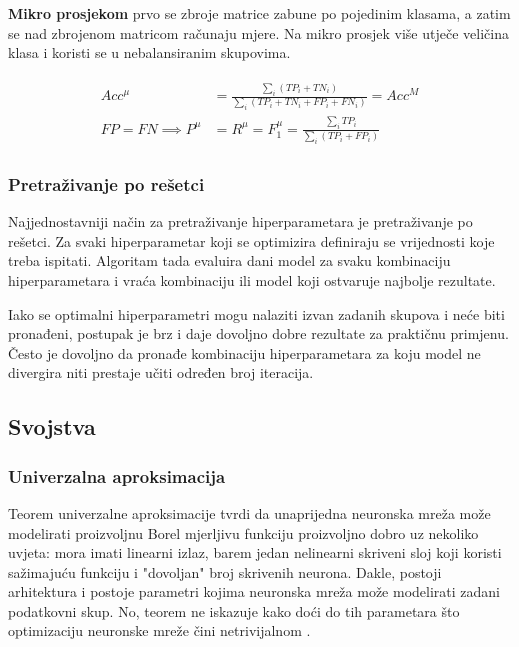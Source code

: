 \documentclass[times, utf8, numeric, diplomski]{fer}
\begin{document}
\textbf{Mikro prosjekom} prvo se zbroje matrice zabune po pojedinim klasama, a zatim se nad zbrojenom matricom računaju mjere. Na mikro prosjek više utječe veličina klasa i koristi se u nebalansiranim skupovima.

\begin{align}
\begin{split}
Acc^\mu &= \frac{\sum_i (TP_i+TN_i)}{\sum_i (TP_i+TN_i+FP_i+FN_i)} = Acc^M \\
FP = FN \implies P^\mu &= R^\mu = F_1^\mu = \frac{\sum_i TP_i}{\sum_i (TP_i+FP_i)}
\end{split}
\end{align}

\subsubsection{Pretraživanje po rešetci}
\label{sec:grid_search}
Najjednostavniji način za pretraživanje hiperparametara je pretraživanje po rešetci. Za svaki hiperparametar koji se optimizira definiraju se vrijednosti koje treba ispitati. Algoritam tada evaluira dani model za svaku kombinaciju hiperparametara i vraća kombinaciju ili model koji ostvaruje najbolje rezultate.

Iako se optimalni hiperparametri mogu nalaziti izvan zadanih skupova i neće biti pronađeni, postupak je brz i daje dovoljno dobre rezultate za praktičnu primjenu. Često je dovoljno da pronađe kombinaciju hiperparametara za koju model ne divergira niti prestaje učiti određen broj iteracija.

\subsection{Svojstva}
\label{sec:svojstva}

\subsubsection{Univerzalna aproksimacija}
Teorem univerzalne aproksimacije tvrdi da unaprijedna neuronska mreža može modelirati proizvoljnu Borel mjerljivu funkciju proizvoljno dobro uz nekoliko uvjeta: mora imati linearni izlaz, barem jedan nelinearni skriveni sloj koji koristi sažimajuću funkciju i "dovoljan" broj skrivenih neurona. Dakle, postoji arhitektura i postoje parametri kojima neuronska mreža može modelirati zadani podatkovni skup. No, teorem ne iskazuje kako doći do tih parametara što optimizaciju neuronske mreže čini netrivijalnom \citep[poglavlje~6.4.1]{goodfellowbook}. 
\end{document}
